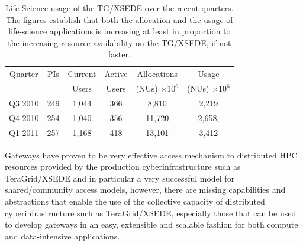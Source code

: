 \documentclass[]{svjour3}
\begin{document}
\begin{table}
\centering
 \small
\begin{tabular}{|c|c|c|c|c|c|} 
  \hline  Quarter & PIs & Current & Active & Allocations  & Usage\\
  & & Users  &  Users & (NUs) $\times 10^6$& (NUs) $\times 10^6$ \\ \hline
  Q3 2010 & 249 & 1,044 & 366 & 8,810   & 2,219  \\ \hline
  Q4 2010 & 254 & 1,040 & 356 & 11,720  & 2,658, \\ \hline
  Q1 2011 & 257 & 1,168 & 418 & 13,101  & 3,412\\ \hline 
\end{tabular} 
\caption{Life-Science usage of the TG/XSEDE over the recent
  quarters. The figures establish that both the  allocation and the
  usage of life-science applications is increasing at least in
  proportion to the increasing resource availability on the TG/XSEDE,
  if not faster.}
 \label{tg2011} 
\end{table}


Gateways have proven to be very effective access mechanism to
distributed HPC resources provided by the production
cyberinfrastructure such as TeraGrid/XSEDE and in particular a very
successful model for shared/community access models, however, there
are missing capabilities and abstractions that enable the use of the
collective capacity of distributed cyberinfrastructure such as
TeraGrid/XSEDE, especially those that can be used to develop gateways
in an easy, extensible and scalable fashion for both compute and
data-intensive applications.


\end{document}
